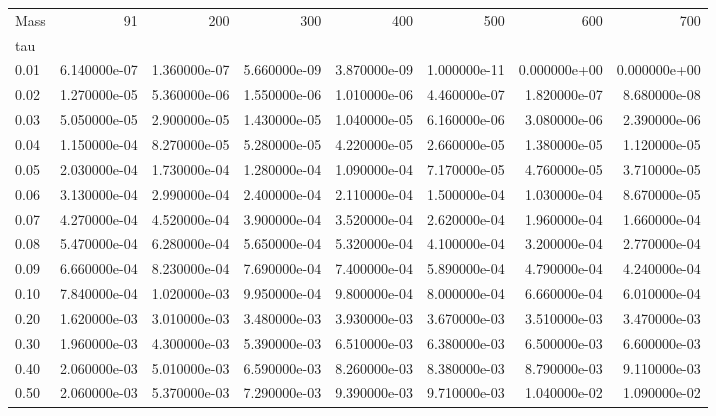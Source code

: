 \begin{tabular}{lrrrrrrr}
\toprule
Mass &           91  &           200 &           300 &           400 &           500 &           600 &           700 \\
tau   &               &               &               &               &               &               &               \\
\midrule
0.01  &  6.140000e-07 &  1.360000e-07 &  5.660000e-09 &  3.870000e-09 &  1.000000e-11 &  0.000000e+00 &  0.000000e+00 \\
0.02  &  1.270000e-05 &  5.360000e-06 &  1.550000e-06 &  1.010000e-06 &  4.460000e-07 &  1.820000e-07 &  8.680000e-08 \\
0.03  &  5.050000e-05 &  2.900000e-05 &  1.430000e-05 &  1.040000e-05 &  6.160000e-06 &  3.080000e-06 &  2.390000e-06 \\
0.04  &  1.150000e-04 &  8.270000e-05 &  5.280000e-05 &  4.220000e-05 &  2.660000e-05 &  1.380000e-05 &  1.120000e-05 \\
0.05  &  2.030000e-04 &  1.730000e-04 &  1.280000e-04 &  1.090000e-04 &  7.170000e-05 &  4.760000e-05 &  3.710000e-05 \\
0.06  &  3.130000e-04 &  2.990000e-04 &  2.400000e-04 &  2.110000e-04 &  1.500000e-04 &  1.030000e-04 &  8.670000e-05 \\
0.07  &  4.270000e-04 &  4.520000e-04 &  3.900000e-04 &  3.520000e-04 &  2.620000e-04 &  1.960000e-04 &  1.660000e-04 \\
0.08  &  5.470000e-04 &  6.280000e-04 &  5.650000e-04 &  5.320000e-04 &  4.100000e-04 &  3.200000e-04 &  2.770000e-04 \\
0.09  &  6.660000e-04 &  8.230000e-04 &  7.690000e-04 &  7.400000e-04 &  5.890000e-04 &  4.790000e-04 &  4.240000e-04 \\
0.10  &  7.840000e-04 &  1.020000e-03 &  9.950000e-04 &  9.800000e-04 &  8.000000e-04 &  6.660000e-04 &  6.010000e-04 \\
0.20  &  1.620000e-03 &  3.010000e-03 &  3.480000e-03 &  3.930000e-03 &  3.670000e-03 &  3.510000e-03 &  3.470000e-03 \\
0.30  &  1.960000e-03 &  4.300000e-03 &  5.390000e-03 &  6.510000e-03 &  6.380000e-03 &  6.500000e-03 &  6.600000e-03 \\
0.40  &  2.060000e-03 &  5.010000e-03 &  6.590000e-03 &  8.260000e-03 &  8.380000e-03 &  8.790000e-03 &  9.110000e-03 \\
0.50  &  2.060000e-03 &  5.370000e-03 &  7.290000e-03 &  9.390000e-03 &  9.710000e-03 &  1.040000e-02 &  1.090000e-02 \\

\end{tabular}
